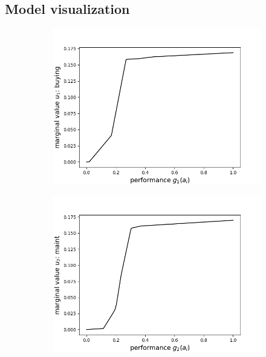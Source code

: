 \documentclass[../main.tex]{subfiles}
\begin{document}
\subsection{Model visualization}
\begin{figure}[H]
    \centering
    \begin{subfigure}[b]{0.48\linewidth}
        \includegraphics[width=\linewidth]{../img/marginal0.png}
    \end{subfigure}
    \begin{subfigure}[b]{0.48\linewidth}
        \includegraphics[width=\linewidth]{../img/marginal1.png}
    \end{subfigure}


\end{figure}
\end{document}
